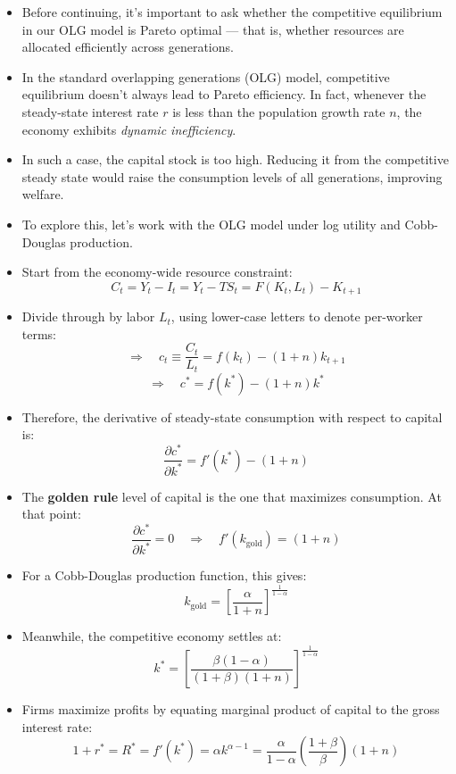 \documentclass[12pt]{article}
\begin{document}
\begin{itemize}
\item Before continuing, it’s important to ask whether the competitive equilibrium in our OLG model is Pareto optimal — that is, whether resources are allocated efficiently across generations.

\item In the standard overlapping generations (OLG) model, competitive equilibrium doesn’t always lead to Pareto efficiency. In fact, whenever the steady-state interest rate \( r \) is less than the population growth rate \( n \), the economy exhibits \textit{dynamic inefficiency}.

\item In such a case, the capital stock is too high. Reducing it from the competitive steady state would raise the consumption levels of all generations, improving welfare.

\item To explore this, let’s work with the OLG model under log utility and Cobb-Douglas production.

\item Start from the economy-wide resource constraint:
\[
C_t = Y_t - I_t = Y_t - T S_t = F(K_t, L_t) - K_{t+1}
\]

\item Divide through by labor \( L_t \), using lower-case letters to denote per-worker terms:
\[
\Rightarrow \quad c_t \equiv \frac{C_t}{L_t} = f(k_t) - (1 + n) k_{t+1}
\]
\[
\Rightarrow \quad c^* = f(k^*) - (1 + n) k^*
\]

\item Therefore, the derivative of steady-state consumption with respect to capital is:
\[
\frac{\partial c^*}{\partial k^*} = f'(k^*) - (1 + n)
\]

\item The \textbf{golden rule} level of capital is the one that maximizes consumption. At that point:
\[
\frac{\partial c^*}{\partial k^*} = 0 \quad \Rightarrow \quad f'(k_{\text{gold}}) = (1 + n)
\]

\item For a Cobb-Douglas production function, this gives:
\[
k_{\text{gold}} = \left[ \frac{\alpha}{1 + n} \right]^{\frac{1}{1 - \alpha}}
\]

\item Meanwhile, the competitive economy settles at:
\[
k^* = \left[ \frac{\beta(1 - \alpha)}{(1 + \beta)(1 + n)} \right]^{\frac{1}{1 - \alpha}}
\]

\item Firms maximize profits by equating marginal product of capital to the gross interest rate:
\[
1 + r^* = R^* = f'(k^*) = \alpha k^{\alpha - 1} = \frac{\alpha}{1 - \alpha} \left( \frac{1 + \beta}{\beta} \right) (1 + n)
\]


\end{itemize}
\end{document}
